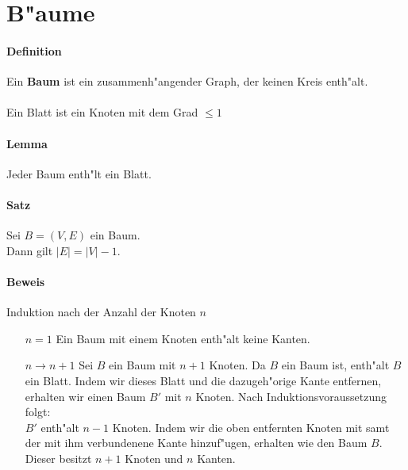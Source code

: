\section{B"aume}

\paragraph{Definition} \parskp
Ein \textbf{Baum} ist ein zusammenh"angender Graph, der keinen Kreis enth"alt.\\
\\
Ein Blatt ist ein Knoten mit dem Grad $\le1$

\paragraph{Lemma} Jeder Baum enth"lt ein Blatt.

\paragraph{Satz} Sei $B=(V,E)$ ein Baum. \\
Dann gilt $|E|=|V|-1$.

\paragraph{Beweis} Induktion nach der Anzahl der Knoten $n$
\begin{itemize}
    \item[$n=1$] Ein Baum mit einem Knoten enth"alt keine Kanten.
    \item[$n\rightarrow n+1$] Sei $B$ ein Baum mit $n+1$ Knoten. Da $B$ ein Baum ist, enth"alt $B$ ein Blatt.
                              Indem wir dieses Blatt und die dazugeh"orige Kante entfernen, erhalten wir einen
                              Baum $B'$ mit $n$ Knoten. Nach Induktionsvoraussetzung folgt:\\
                              $B'$ enth"alt $n-1$ Knoten. Indem wir die oben entfernten Knoten mit samt der mit
                              ihm verbundenene Kante hinzuf"ugen, erhalten wie den Baum $B$. Dieser besitzt $n+1$
                              Knoten und $n$ Kanten.
\end{itemize}

